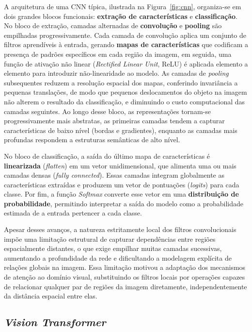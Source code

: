 A arquitetura de uma CNN típica, ilustrada na Figura~\ref{fig:cnn}, organiza-se em dois grandes blocos funcionais: \textbf{extração de características} e \textbf{classificação}. No bloco de extração, camadas alternadas de \textbf{convolução} e \textbf{pooling} são empilhadas progressivamente. Cada camada de convolução aplica um conjunto de filtros aprendíveis à entrada, gerando \textbf{mapas de características} que codificam a presença de padrões específicos em cada região da imagem, em seguida, uma função de ativação não linear (\textit{Rectified Linear Unit}, ReLU) é aplicada elemento a elemento para introduzir não-linearidade ao modelo. As camadas de \textit{pooling} subsequentes reduzem a resolução espacial dos mapas, conferindo invariância a pequenas translações, de modo que pequenos deslocamentos do objeto na imagem  não alterem o resultado da classificação, e diminuindo o custo computacional das camadas seguintes. Ao longo desse bloco, as representações tornam-se progressivamente mais abstratas, as primeiras camadas tendem a capturar características de baixo nível (bordas e gradientes), enquanto as camadas mais profundas respondem a estruturas semânticas de alto nível.

No bloco de classificação, a saída do último mapa de características é \textbf{linearizada} (\textit{flatten}) em um vetor unidimensional, que alimenta uma ou mais camadas densas (\textit{fully connected}). Essas camadas integram globalmente as características extraídas e produzem um vetor de pontuações (\textit{logits}) para cada classe. Por fim, a função \textit{Softmax} converte esse vetor em uma \textbf{distribuição de probabilidade}, permitindo interpretar a saída do modelo como a probabilidade estimada de a entrada pertencer a cada classe.

Apesar desses avanços, a natureza estritamente local dos filtros convolucionais
impõe uma limitação estrutural de capturar dependências entre regiões espacialmente
distantes, o que exige empilhar muitas camadas sucessivas, aumentando a profundidade da
rede e dificultando a modelagem explícita de relações globais na imagem. Essa
limitação motivou a adaptação dos mecanismos de atenção ao domínio visual, substituindo os filtros locais por operações capazes de relacionar qualquer par de regiões da imagem diretamente,
independentemente da distância espacial entre elas.

\subsection{\textit{Vision Transformer}}

